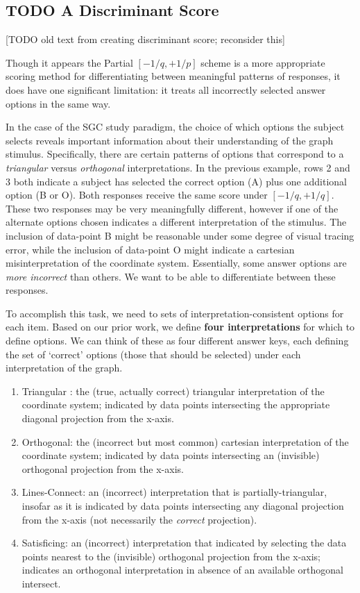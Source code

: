 \documentclass[
  letterpaper,
  DIV=11,
  numbers=noendperiod]{scrreprt}
\providecommand{\tightlist}{%
  \setlength{\itemsep}{0pt}\setlength{\parskip}{0pt}}\usepackage{longtable,booktabs,array}
\begin{document}
\hypertarget{todo-a-discriminant-score}{%
\subsection{TODO A Discriminant Score}\label{todo-a-discriminant-score}}

{[}TODO old text from creating discriminant score; reconsider this{]}

Though it appears the Partial \([-1/q, +1/p]\) scheme is a more
appropriate scoring method for differentiating between meaningful
patterns of responses, it does have one significant limitation: it
treats all incorrectly selected answer options in the same way.

In the case of the SGC study paradigm, the choice of which options the
subject selects reveals important information about their understanding
of the graph stimulus. Specifically, there are certain patterns of
options that correspond to a \emph{triangular} versus \emph{orthogonal}
interpretations. In the previous example, rows 2 and 3 both indicate a
subject has selected the correct option (A) plus one additional option
(B or O). Both responses receive the same score under \([-1/q, +1/q]\).
These two responses may be very meaningfully different, however if one
of the alternate options chosen indicates a different interpretation of
the stimulus. The inclusion of data-point B might be reasonable under
some degree of visual tracing error, while the inclusion of data-point O
might indicate a cartesian misinterpretation of the coordinate system.
Essentially, some answer options are \emph{more incorrect} than others.
We want to be able to differentiate between these responses.

To accomplish this task, we need to sets of interpretation-consistent
options for each item. Based on our prior work, we define \textbf{four
interpretations} for which to define options. We can think of these as
four different answer keys, each defining the set of `correct' options
(those that should be selected) under each interpretation of the graph.

\begin{enumerate}
\def\labelenumi{\arabic{enumi}.}
\tightlist
\item
  Triangular : the (true, actually correct) triangular interpretation of
  the coordinate system; indicated by data points intersecting the
  appropriate diagonal projection from the x-axis.
\item
  Orthogonal: the (incorrect but most common) cartesian interpretation
  of the coordinate system; indicated by data points intersecting an
  (invisible) orthogonal projection from the x-axis.
\item
  Lines-Connect: an (incorrect) interpretation that is
  partially-triangular, insofar as it is indicated by data points
  intersecting any diagonal projection from the x-axis (not necessarily
  the \emph{correct} projection).
\item
  Satisficing: an (incorrect) interpretation that indicated by selecting
  the data points nearest to the (invisible) orthogonal projection from
  the x-axis; indicates an orthogonal interpretation in absence of an
  available orthogonal intersect.
\end{enumerate}
\end{document}
